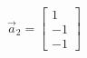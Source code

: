 \documentclass[preview]{standalone}
\begin{document}
\begin{align*}
\vec{a}_2=\begin{bmatrix} 1 \\ -1 \\ -1 \end{bmatrix}
\end{align*}
\end{document}
